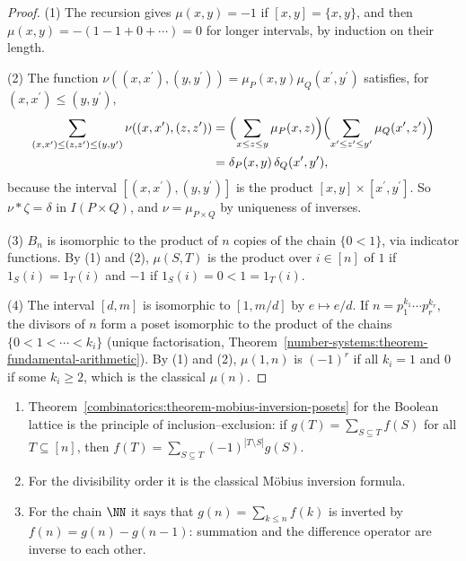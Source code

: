 \begin{proof}
(1) The recursion gives $\mu(x, y) = -1$ if $[x, y] = \{x, y\}$, and then $\mu(x, y) = -(1 - 1 + 0 + \cdots) = 0$ for longer intervals, by induction on their length.

(2) The function $\nu((x, x^{\prime}), (y, y^{\prime})) = \mu_P(x, y)\mu_Q(x^{\prime}, y^{\prime})$ satisfies, for $(x, x^{\prime}) \leq (y, y^{\prime})$,
\[
\begin{aligned}
\sum_{(x,x^{\prime}) \leq (z,z^{\prime}) \leq (y,y^{\prime})}\nu((x, x^{\prime}), (z, z^{\prime}))
&= \Bigl(\sum_{x \leq z \leq y}\mu_P(x, z)\Bigr)\Bigl(\sum_{x^{\prime} \leq z^{\prime} \leq y^{\prime}}\mu_Q(x^{\prime}, z^{\prime})\Bigr)\\
&= \delta_P(x, y)\,\delta_Q(x^{\prime}, y^{\prime}),
\end{aligned}
\]
because the interval $[(x, x^{\prime}), (y, y^{\prime})]$ is the product $[x, y] \times [x^{\prime}, y^{\prime}]$. So $\nu \ast \zeta = \delta$ in $I(P \times Q)$, and $\nu = \mu_{P \times Q}$ by uniqueness of inverses.

(3) $B_n$ is isomorphic to the product of $n$ copies of the chain $\{0 < 1\}$, via indicator functions. By (1) and (2), $\mu(S, T)$ is the product over $i \in [n]$ of $1$ if $1_S(i) = 1_T(i)$ and $-1$ if
$1_S(i) = 0 < 1 = 1_T(i)$.

(4) The interval $[d, m]$ is isomorphic to $[1, m/d]$ by $e \mapsto e/d$. If $n = p_1^{k_1} \cdots p_r^{k_r}$, the divisors of $n$ form a poset isomorphic to the product of the chains
$\{0 < 1 < \cdots < k_i\}$ (unique factorisation, Theorem~\ref{number-systems:theorem-fundamental-arithmetic}). By (1) and (2), $\mu(1, n)$ is $(-1)^r$ if all $k_i = 1$ and $0$ if some $k_i \geq 2$,
which is the classical $\mu(n)$.
\end{proof}

\begin{corollary}\label{combinatorics:corollary-mobius-special-cases}
\begin{enumerate}
\item Theorem~\ref{combinatorics:theorem-mobius-inversion-posets} for the Boolean lattice is the principle of inclusion--exclusion: if $g(T) = \sum_{S \subseteq T}f(S)$ for all $T \subseteq [n]$,
then $f(T) = \sum_{S \subseteq T}(-1)^{|T \setminus S|}g(S)$.
\item For the divisibility order it is the classical M\"obius inversion formula.
\item For the chain $\NN$ it says that $g(n) = \sum_{k \leq n}f(k)$ is inverted by $f(n) = g(n) - g(n - 1)$: summation and the difference operator are inverse to each other.
\end{enumerate}
\end{corollary}

